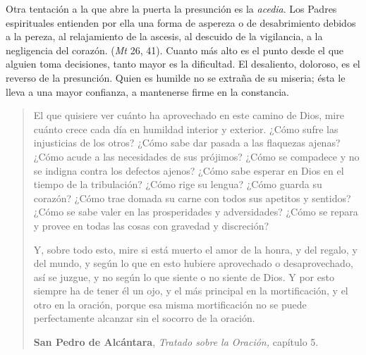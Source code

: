 \begin{ccebody}
	 Otra tentación a la que abre la puerta la presunción es la \emph{acedia}. Los Padres espirituales entienden por ella una forma de aspereza o de desabrimiento debidos a la pereza, al relajamiento de la ascesis, al descuido de la vigilancia, a la negligencia del corazón.  (\emph{Mt} 26, 41). Cuanto más alto es el punto desde el que alguien toma decisiones, tanto mayor es la dificultad. El desaliento, doloroso, es el reverso de la presunción. Quien es humilde no se extraña de su miseria; ésta le lleva a una mayor confianza, a mantenerse firme en la constancia.

	\begin{quote}
		
		El que quisiere ver cuánto ha aprovechado en este camino de Dios, mire cuánto crece cada día en humildad interior y exterior. ¿Cómo sufre las injusticias de los otros? ¿Cómo sabe dar pasada a las flaquezas ajenas? ¿Cómo acude a las necesidades de sus prójimos? ¿Cómo se compadece y no se indigna contra los defectos ajenos? ¿Cómo sabe esperar en Dios en el tiempo de la tribulación? ¿Cómo rige su lengua? ¿Cómo guarda su corazón? ¿Cómo trae domada su carne con todos sus apetitos y sentidos? ¿Cómo se sabe valer en las prosperidades y adversidades? ¿Cómo se repara y provee en todas las cosas con gravedad y discreción?
	
		Y, sobre todo esto, mire si está muerto el amor de la honra, y del regalo, y del mundo, y según lo que en esto hubiere aprovechado o desaprovechado, así se juzgue, y no según lo que siente o no siente de Dios. Y por esto siempre ha de tener él un ojo, y el más principal en la mortificación, y el otro en la oración, porque esa misma mortificación no se puede perfectamente alcanzar sin el socorro de la oración.
	
		\textbf{San Pedro de Alcántara}, \emph{Tratado sobre la Oración,} capítulo 5.
		
	\end{quote}

\end{ccebody}